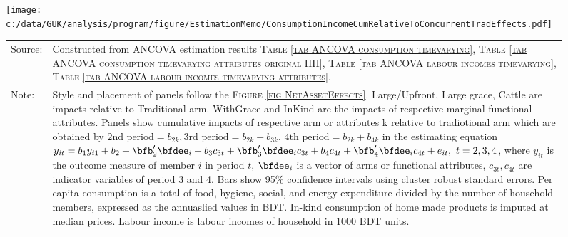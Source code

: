 \begin{figure}
{\vspace{2ex}
\hspace{-2em}\texttt{[image: c:/data/GUK/analysis/program/figure/EstimationMemo/ConsumptionIncomeCumRelativeToConcurrentTradEffects.pdf]}\\
\renewcommand{\arraystretch}{1}
\setlength{\tabcolsep}{1pt}
\hfil\begin{tabular}{>{\hfill\scriptsize}p{1cm}<{}>{\scriptsize}p{12.5cm}<{\hfill}}
Source: & Constructed from ANCOVA estimation results 
\textsc{Table \ref{tab ANCOVA consumption timevarying}}, \textsc{Table \ref{tab ANCOVA consumption timevarying attributes original HH}}, \textsc{Table \ref{tab ANCOVA labour incomes timevarying}}, \textsc{Table \ref{tab ANCOVA labour incomes timevarying attributes}}.\\
Note:& Style and placement of panels follow the \textsc{\footnotesize Figure \ref{fig NetAssetEffects}}. \textsf{Large/Upfront}, \textsf{Large grace}, \textsf{Cattle} are impacts relative to \textsf{Traditional} arm. \textsf{WithGrace} and \textsf{InKind} are the impacts of respective marginal functional attributes. Panels show cumulative impacts of respective arm or attributes \textsf{k} relative to \textsf{tradiotional} arm which are obtained by $\mbox{2nd period}=b_{2k}, \mbox{3rd period}=b_{2k}+b_{3k}$, $\mbox{4th period}=b_{2k}+b_{4k}$ in the estimating equation $y_{it}=b_{1}y_{i1}+b_{2}+\bfb'_{2}\bfdee_{i}+b_{3}c_{3t}+\bfb'_{3}\bfdee_{i}c_{3t}+b_{4}c_{4t}+\bfb'_{4}\bfdee_{i}c_{4t}+e_{it}, \ t=2, 3, 4$, where $y_{it}$ is the outcome measure of member $i$ in period $t$, $\bfdee_{i}$ is a vector of arms or functional attributes, $c_{3t}, c_{4t}$ are indicator variables of period 3 and 4. Bars show 95\% confidence intervals using cluster robust standard errors. \textsf{Per capita consumption} is a total of food, hygiene, social, and energy expenditure divided by the number of household members, expressed as the annuaslied values in BDT. In-kind consumption of home made products is imputed at median prices. \textsf{Labour income} is labour incomes of household in 1000 BDT units. \\[1ex]
\end{tabular}
}
\end{figure}

